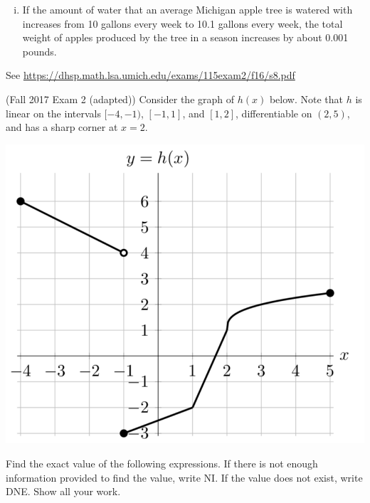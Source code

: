 \documentclass[11pt]{exam}
\begin{document}
\begin{questions}
\begin{enumerate}[(a)]
\begin{enumerate}[(i)]
	\item If the amount of water that an average Michigan apple tree is watered with increases from 10 gallons every week to 10.1 gallons every week, the total weight of apples produced by the tree in a season increases by about 0.001 pounds.
	\end{enumerate}
	\end{enumerate}
        \begin{solution}
          See \href{https://dhsp.math.lsa.umich.edu/exams/115exam2/f16/s8.pdf}{https://dhsp.math.lsa.umich.edu/exams/115exam2/f16/s8.pdf}
        \end{solution}
      \question (Fall 2017 Exam 2 (adapted)) %
        Consider the graph of $h(x)$ below. Note that $h$ is linear on the intervals $[-4, -1)$, $[-1, 1]$, and $[1, 2]$, differentiable on $(2, 5)$, and has a sharp corner at $x = 2$.\\
        \begin{minipage}{0.5\linewidth}
          \begin{center}
            \includegraphics[scale=0.5]{Figures/graphh.png}
          \end{center}
        \end{minipage}
        \begin{minipage}{0.5\linewidth}
          Find the exact value of the following expressions. If there
          is not enough information provided to find the value, write
          NI. If the value does not exist, write DNE. Show all your
          work.

\end{minipage}
\end{questions}
\end{document}
